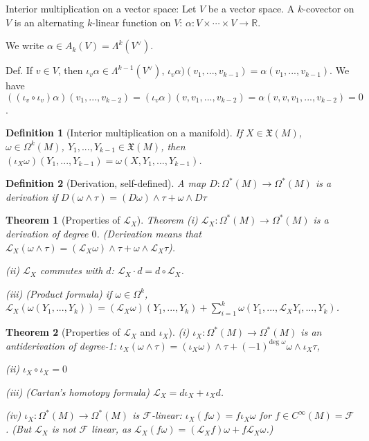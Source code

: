 \documentclass{article}
\theoremstyle{mystyle}
\newtheorem*{definition}{Definition}%
\newtheorem*{theorem*}{Theorem}
\theoremstyle{remark}
\numberwithin{equation}{section}
\begin{document}
Interior multiplication on a vector space: Let $V$ be a vector space. A $k$-covector on $V$ is an alternating $k$-linear function on $V$: $\alpha\colon V\times \cdots \times V \rightarrow \mathbb{R}$.

We write $\alpha \in A_k(V) = \Lambda^k(V^\vee)$.

Def. If $v\in V$, then $\iota_v\alpha \in \Lambda^{k-1}(V^\vee)$, $\iota_v\alpha)(v_1,...,v_{k-1}) = \alpha(v_1,...,v_{k-1})$. We have $((\iota_v\circ \iota_v)\alpha)(v_1,...,v_{k-2}) = (\iota_v\alpha)(v,v_1,...,v_{k-2}) = \alpha(v,v,v_1,...,v_{k-2}) = 0$. 

 

\begin{definition}[Interior multiplication on a manifold]
If $X \in \mathfrak{X}(M)$, $\omega \in \Omega^k(M)$, $Y_1,...,Y_{k-1} \in \mathfrak{X}(M)$, then $(\iota_X\omega)(Y_1,...,Y_{k-1}) = \omega(X,Y_1,...,Y_{k-1})$. 
\end{definition}


\begin{definition}[Derivation, self-defined]
A map $D\colon \Omega^*(M)\rightarrow \Omega^*(M)$ is a \emph{derivation} if 
$D(\omega\wedge \tau) = (D\omega) \wedge \tau + \omega \wedge D\tau$
\end{definition}


\begin{theorem*}[Properties of $\mathcal{L}_X$]
Theorem (i) $\mathcal{L}_X\colon \Omega^*(M)\rightarrow \Omega^*(M)$ is a \emph{derivation} of degree $0$. (Derivation means that $\mathcal{L}_X(\omega\wedge \tau) = (\mathcal{L}_X\omega) \wedge \tau + \omega \wedge \mathcal{L}_X\tau$).

(ii) $\mathcal{L}_X$ commutes with $d$: $\mathcal{L}_X\cdot d = d\circ \mathcal{L}_X$.

(iii) (Product formula) if $\omega \in \Omega^k$, $\mathcal{L}_X(\omega(Y_1,...,Y_k)) = (\mathcal{L}_X\omega)(Y_1,...,Y_k) + \sum_{i=1}^k \omega(Y_1,...,\mathcal{L}_XY_i,...,Y_k)$.
\end{theorem*}

\begin{theorem*}[Properties of $\mathcal{L}_X$ and $\iota_X$] (i) $\iota_X\colon \Omega^*(M)\rightarrow \Omega^*(M)$ is an antiderivation of degree-1: $\iota_X(\omega\wedge \tau) = (\iota_X\omega)\wedge \tau   + (-1)^{\text{deg }\omega}\omega \wedge \iota_X\tau$,

(ii) $\iota_X\circ \iota_X = 0$

(iii) (Cartan's homotopy formula) $\mathcal{L}_X = d\iota_X + \iota_X d$. 

(iv) $\iota_X\colon \Omega^*(M)\rightarrow \Omega^*(M)$ is $\mathcal{F}$-linear: $\iota_X(f\omega) = f\iota_X\omega$ for $f\in C^\infty(M) = \mathcal{F}$. (But $\mathcal{L}_X$ is not $\mathcal{F}$ linear, as $\mathcal{L}_X(f\omega) = (\mathcal{L}_Xf) \omega + f\mathcal{L}_X\omega$.)
\end{theorem*}
\end{document}
